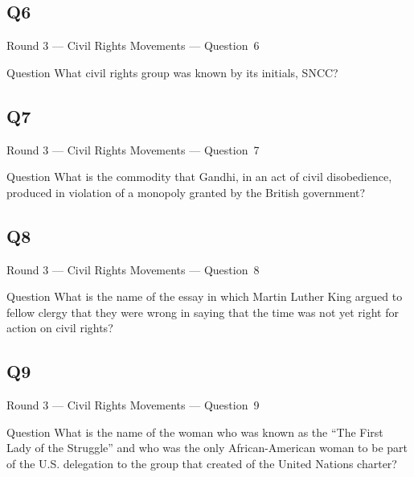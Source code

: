 \documentclass[11pt]{beamer}
\begin{document}
\subsection*{Q6}
\begin{frame}[t]{Round 3 --- Civil Rights Movements --- \mbox{Question 6}}
\vspace{-0.5em}
\begin{block}{Question}
What civil rights group was known by its initials, SNCC\@?
\end{block}
\end{frame}
\subsection*{Q7}
\begin{frame}[t]{Round 3 --- Civil Rights Movements --- \mbox{Question 7}}
\vspace{-0.5em}
\begin{block}{Question}
What is the commodity that Gandhi, in an act of civil disobedience, produced in violation of a monopoly granted by the British government?
\end{block}
\end{frame}
\subsection*{Q8}
\begin{frame}[t]{Round 3 --- Civil Rights Movements --- \mbox{Question 8}}
\vspace{-0.5em}
\begin{block}{Question}
What is the name of the essay in which Martin Luther King argued to fellow clergy that they were wrong in saying that the time was not yet right for action on civil rights?
\end{block}
\end{frame}
\subsection*{Q9}
\begin{frame}[t]{Round 3 --- Civil Rights Movements --- \mbox{Question 9}}
\vspace{-0.5em}
\begin{block}{Question}
What is the name of the woman who was known as the ``The First Lady of the Struggle'' and who was the only African-American woman to be part of the U.S. delegation to the group that created of the United Nations charter?
\end{block}
\end{frame}
\end{document}
